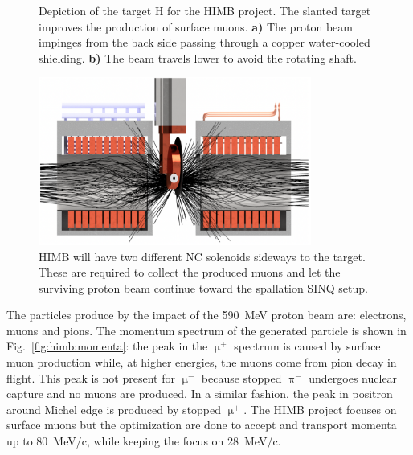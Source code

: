 \begin{refsection}
\begin{figure}
{            \label{fig:himb:target:a}}
            \caption[HIMB: H target]{Depiction of the target H for the HIMB project. The slanted target improves the production of surface muons. \textbf{a)} The proton beam impinges from the back side passing through a copper water-cooled shielding. \textbf{b)} The beam travels lower to avoid the rotating shaft.}
            \label{fig:himb:target}
        \end{figure}


        \begin{figure}[h]
            \centering
            \includegraphics[width=0.8\textwidth]{Figures/Introduction/himb_solenoids.png}
            \caption[HIMB: collection solenoids]{HIMB will have two different NC solenoids sideways to the target. These are required to collect the produced muons and let the surviving proton beam continue toward the spallation SINQ setup.}
            \label{fig:himb:solenoids}
        \end{figure}

        \noindent
        The particles produce by the impact of the \SI{590}{MeV} proton beam are: electrons, muons and pions.
        The momentum spectrum of the generated particle is shown in Fig.~\ref{fig:himb:momenta}: the peak in the $\upmu^+$ spectrum is caused by surface muon production while, at higher energies, the muons come from pion decay in flight. 
        This peak is not present for $\upmu^-$ because stopped $\uppi^-$ undergoes nuclear capture and no muons are produced.  
        In a similar fashion, the peak in positron around Michel edge is produced by stopped $\upmu^+$.
        The HIMB project focuses on surface muons but the optimization are done to accept and transport momenta up to \SI{80}{MeV/c}, while keeping the focus on \SI{28}{MeV/c}.
        

\end{refsection}
